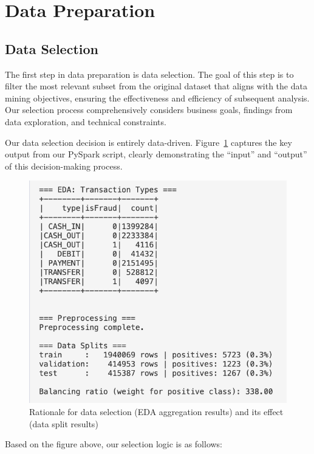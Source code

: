 \documentclass[sigplan,screen]{acmart}
\begin{document}
\section{Data Preparation}

\subsection{Data Selection}

The first step in data preparation is data selection. The goal of this step is to filter the most relevant subset from the original dataset that aligns with the data mining objectives, ensuring the effectiveness and efficiency of subsequent analysis. Our selection process comprehensively considers business goals, findings from data exploration, and technical constraints.

Our data selection decision is entirely data-driven. Figure~\ref{fig:data-selection} captures the key output from our PySpark script, clearly demonstrating the ``input'' and ``output'' of this decision-making process.

\begin{figure}[h]
  \centering
  \includegraphics[width=\linewidth]{Figure/3.1a.png}
  \caption{Rationale for data selection (EDA aggregation results) and its effect (data split results)}
  \label{fig:data-selection}
\end{figure}

Based on the figure above, our selection logic is as follows:
\end{document}

